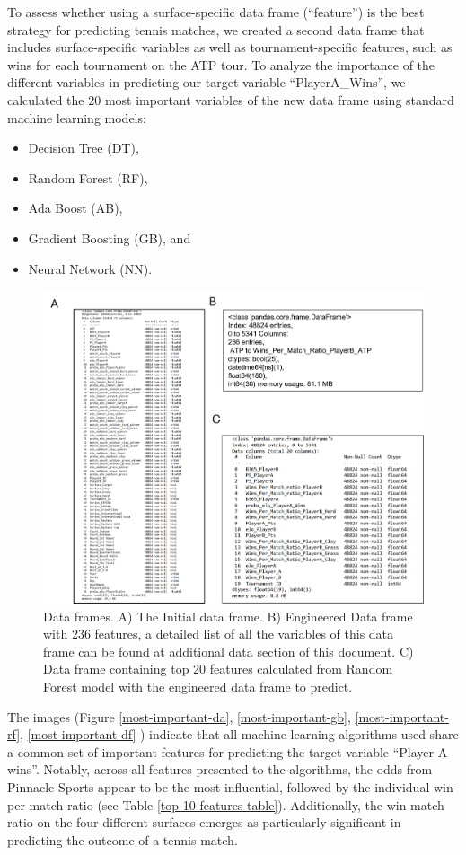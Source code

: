 \documentclass[preprint,aps,nofootinbib,a4paper,superscriptaddress,longbibliography,amsfonts,amssymb,amsmath,titlepage]{revtex4-2}
\begin{document}
To assess whether using a surface-specific data frame (``feature'') is the best strategy for predicting tennis matches, we created a second data frame that includes surface-specific variables as well as tournament-specific features, such as wins for each tournament on the ATP tour. To analyze the importance of the different variables in predicting our target variable ``PlayerA\_Wins'', we calculated the 20 most important variables of the new data frame using standard machine learning models:
%
\begin{itemize}
\item Decision Tree (DT),
\item Random Forest (RF),
\item Ada Boost (AB),
\item Gradient Boosting (GB), and
\item Neural Network (NN).
\end{itemize}

\begin{figure}[h]
\includegraphics[width=\textwidth]{pictures/dataframes-patrick.png}
\caption{Data frames. A)  The Initial data frame. B) Engineered Data frame with 236 features, a detailed list of all the variables of this data frame can be found at additional data section of this document. C) Data frame containing top 20 features calculated from Random Forest model with the engineered data frame to predict.}
\label{dataframes-patrick}
\end{figure}
%

The images (Figure \ref{most-important-da}, \ref{most-important-gb}, \ref{most-important-rf}, \ref{most-important-df} ) indicate that all machine learning algorithms used share a common set of important features for predicting the target variable ``Player A wins''. Notably, across all features presented to the algorithms, the odds from Pinnacle Sports appear to be the most influential, followed by the individual win-per-match ratio (see Table \ref{top-10-features-table}). Additionally, the win-match ratio on the four different surfaces emerges as particularly significant in predicting the outcome of a tennis match.
\end{document}
